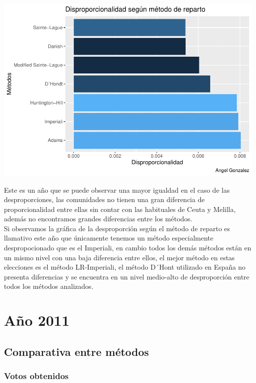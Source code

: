 \documentclass[12pt,a4paper,]{book}
\numberwithin{dummy}{section}
\theoremstyle{ocrenumbox}
\theoremstyle{blacknumex}
\theoremstyle{blacknumbox}
\theoremstyle{ocrenum}
\theoremstyle{ocrenum}
\begin{document}
\begin{center}\includegraphics[width=1\linewidth]{figurasR/unnamed-chunk-33-2} \end{center}

Este es un año que se puede observar una mayor igualdad en el caso de
las desproporciones, las comunidades no tienen una gran diferencia de
proporcionalidad entre ellas sin contar con las habituales de Ceuta y
Melilla, además no encontramos grandes diferencias entre los métodos.\\
Si observamos la gráfica de la desproporción según el método de reparto
es llamativo este año que únicamente tenemos un método especialmente
despropocionado que es el Imperiali, en cambio todos los demás métodos
están en un mismo nivel con una baja diferencia entre ellos, el mejor
método en estas elecciones es el método LR-Imperiali, el método D´Hont
utilizado en España no presenta diferencias y se encuentra en un nivel
medio-alto de desproporción entre todos los métodos analizados.

\hypertarget{auxf1o-2011}{%
\section{Año 2011}\label{auxf1o-2011}}

\hypertarget{comparativa-entre-muxe9todos-10}{%
\subsection{Comparativa entre
métodos}\label{comparativa-entre-muxe9todos-10}}

\hypertarget{votos-obtenidos-10}{%
\subsubsection{Votos obtenidos}\label{votos-obtenidos-10}}
\end{document}
